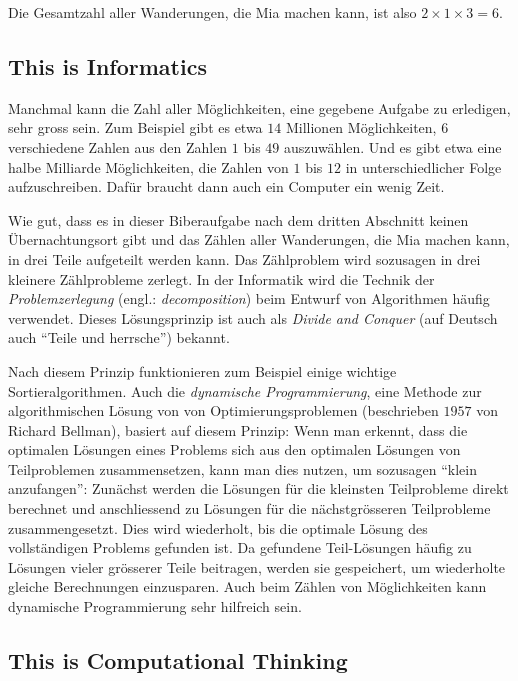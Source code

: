 \documentclass[a4paper,11pt]{report}
\begin{document}
Die Gesamtzahl aller Wanderungen, die Mia machen kann, ist also ${2 \times 1 \times 3 = 6}$.


\subsection*{This is Informatics}

Manchmal kann die Zahl aller Möglichkeiten, eine gegebene Aufgabe zu erledigen, sehr gross sein.  Zum Beispiel gibt es etwa $14$ Millionen Möglichkeiten, $6$ verschiedene Zahlen aus den Zahlen $1$ bis $49$ auszuwählen.  Und es gibt etwa eine halbe Milliarde Möglichkeiten, die Zahlen von $1$ bis $12$ in unterschiedlicher Folge aufzuschreiben.  Dafür braucht dann auch ein Computer ein wenig Zeit.

Wie gut, dass es in dieser Biberaufgabe nach dem dritten Abschnitt keinen Übernachtungsort gibt und das Zählen aller Wanderungen, die Mia machen kann, in drei Teile aufgeteilt werden kann.  Das Zählproblem wird sozusagen in drei kleinere Zählprobleme zerlegt.  In der Informatik wird die Technik der \emph{Problemzerlegung} (engl.: \emph{decomposition}) beim Entwurf von Algorithmen häufig verwendet.  Dieses Lösungsprinzip ist auch als \emph{Divide and Conquer} (auf Deutsch auch \enquote{Teile und herrsche}) bekannt.

Nach diesem Prinzip funktionieren zum Beispiel einige wichtige Sortieralgorithmen.  Auch die \emph{dynamische Programmierung}, eine Methode zur algorithmischen Lösung von von Optimierungsproblemen (beschrieben $1957$ von Richard Bellman), basiert auf diesem Prinzip:  Wenn man erkennt, dass die optimalen Lösungen eines Problems sich aus den optimalen Lösungen von Teilproblemen zusammensetzen, kann man dies nutzen, um sozusagen \enquote{klein anzufangen}:  Zunächst werden die Lösungen für die kleinsten Teilprobleme direkt berechnet und anschliessend zu Lösungen für die nächstgrösseren Teilprobleme zusammengesetzt.  Dies wird wiederholt, bis die optimale Lösung des vollständigen Problems gefunden ist.  Da gefundene Teil-Lösungen häufig zu Lösungen vieler grösserer Teile beitragen, werden sie gespeichert, um wiederholte gleiche Berechnungen einzusparen.  Auch beim Zählen von Möglichkeiten kann dynamische Programmierung sehr hilfreich sein.


\subsection*{This is Computational Thinking}
\end{document}
